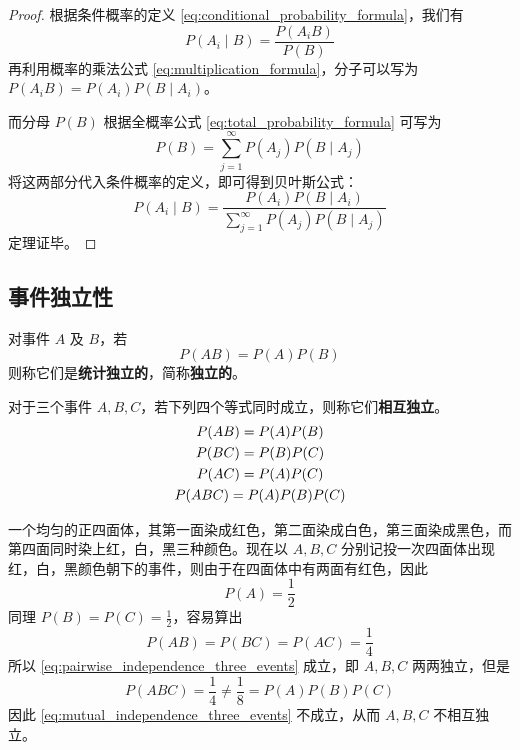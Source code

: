 \begin{proof}
根据条件概率的定义 \eqref{eq:conditional_probability_formula}，我们有
\[
P(A_i \mid B) = \frac{P(A_i B)}{P(B)}
\]
再利用概率的乘法公式 \eqref{eq:multiplication_formula}，分子可以写为 $P(A_i B) = P(A_i)P(B \mid A_i)$。

而分母 $P(B)$ 根据全概率公式 \eqref{eq:total_probability_formula} 可写为
\[
P(B) = \sum_{j=1}^\infty P(A_j)P(B \mid A_j)
\]
将这两部分代入条件概率的定义，即可得到贝叶斯公式：
\[
P(A_i \mid B) = \frac{P(A_i)P(B \mid A_i)}{\sum_{j=1}^\infty P(A_j)P(B \mid A_j)}
\]
定理证毕。
\end{proof}
\subsection{事件独立性}\label{subsec:事件独立性}
\begin{definition}[独立性] \label{def:statistical_independence}
对事件 $A$ 及 $B$，若
\begin{equation} \label{eq:statistical_independence_formula}
P(AB) = P(A)P(B)
\end{equation}
则称它们是\textbf{统计独立的}，简称\textbf{独立的}。
\end{definition}
\begin{definition}[三个事件的独立性] \label{def:mutual_independence_three_events}
对于三个事件 $A,B,C$，若下列四个等式同时成立，则称它们\textbf{相互独立}。
\begin{gather}
P(AB)=P(A)P(B) \notag \\
P(BC)=P(B)P(C) \notag \\
P(AC)=P(A)P(C) \label{eq:pairwise_independence_three_events} \\
P(ABC)=P(A)P(B)P(C) \label{eq:mutual_independence_three_events}
\end{gather}
\end{definition}
\begin{example}[ Bernstein反例]
    一个均匀的正四面体，其第一面染成红色，第二面染成白色，第三面染成黑色，而第四面同时染上红，白，黑三种颜色。现在以 $A,B,C$ 分别记投一次四面体出现红，白，黑颜色朝下的事件，则由于在四面体中有两面有红色，因此
\[
P(A)=\frac{1}{2}
\]
同理 $P(B)=P(C)=\frac{1}{2}$，容易算出
\[
P(AB)=P(BC)=P(AC)=\frac{1}{4}
\]
所以 \eqref{eq:pairwise_independence_three_events} 成立，即 $A,B,C$ 两两独立，但是
\[
P(ABC) = \frac{1}{4} \ne \frac{1}{8} = P(A)P(B)P(C)
\]
因此 \eqref{eq:mutual_independence_three_events} 不成立，从而 $A,B,C$ 不相互独立。
\end{example}
